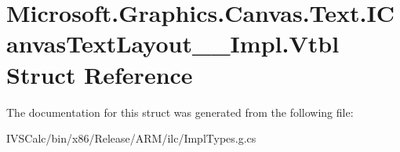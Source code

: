 \hypertarget{struct_microsoft_1_1_graphics_1_1_canvas_1_1_text_1_1_i_canvas_text_layout_____impl_1_1_vtbl}{}\section{Microsoft.\+Graphics.\+Canvas.\+Text.\+I\+Canvas\+Text\+Layout\+\_\+\+\_\+\+Impl.\+Vtbl Struct Reference}
\label{struct_microsoft_1_1_graphics_1_1_canvas_1_1_text_1_1_i_canvas_text_layout_____impl_1_1_vtbl}


The documentation for this struct was generated from the following file\+:\begin{DoxyCompactItemize}
\item 
I\+V\+S\+Calc/bin/x86/\+Release/\+A\+R\+M/ilc/Impl\+Types.\+g.\+cs\end{DoxyCompactItemize}
